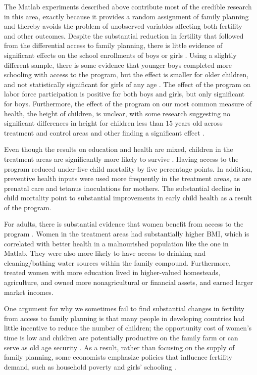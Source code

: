 \documentclass[letterpaper,12pt]{article}
\begin{document}
The Matlab experiments described above contribute most of the 
credible research in this area, exactly because it provides a 
random assignment of family planning and thereby avoids the problem
of unobserved variables affecting both fertility and other outcomes.
Despite the substantial reduction in fertility that followed from the
differential access to family planning, there is little evidence of
significant effects on the school enrollments of boys or girls
\citep{Sinha2005}.
Using a slightly different sample, there is some evidence that younger 
boys completed more schooling with access to the program, but the effect is
smaller for older children, and not statistically significant for girls
of any age \citep{Joshi2007}.
The effect of the program on labor force participation is positive for
both boys and girls, but only signiﬁcant for boys.
Furthermore, the effect of the program on our most common measure of
health, the height of children, is unclear, with some research
suggesting no significant differences in height for children less than
15 years old across treatment and control areas \citep{Joshi2007} and
other finding a significant effect \citep{Barham2012}.

Even though the results on education and health are mixed, children in
the treatment areas are significantly more likely to survive
\citep{Joshi2007}.
Having access to the program reduced under-five child mortality by five
percentage points.
In addition, preventive health inputs were used more frequently in the
treatment areas, as are prenatal care and tetanus inoculations for
mothers.
The substantial decline in child mortality point to substantial
improvements in early child health as a result of the program.

For adults, there is substantial evidence that women benefit from access
to the program \citep{Joshi2007}.
Women in the treatment areas had substantially higher BMI, which is
correlated with better health in a malnourished population like the one
in Matlab.
They were also more likely to have access to drinking and
cleaning/bathing water sources within the family compound.
Furthermore, treated women with more education lived in higher-valued
homesteads, agriculture, and owned more nonagricultural or financial
assets, and earned larger market incomes.

One argument for why we sometimes fail to find substantial changes in
fertility from access to family planning is that many people in
developing countries had little incentive to reduce the number of
children; the opportunity cost of women's time is low and children are
potentially productive on the family farm or can serve as old age
security \citep{Banerjee2014,Lambert2016}.
As a result, rather than focusing on the supply of family planning, some
economists emphasize policies that influence fertility demand, such as
household poverty and girls' schooling
\citep{pritchett94a,DasGupta2011}.
\end{document}
